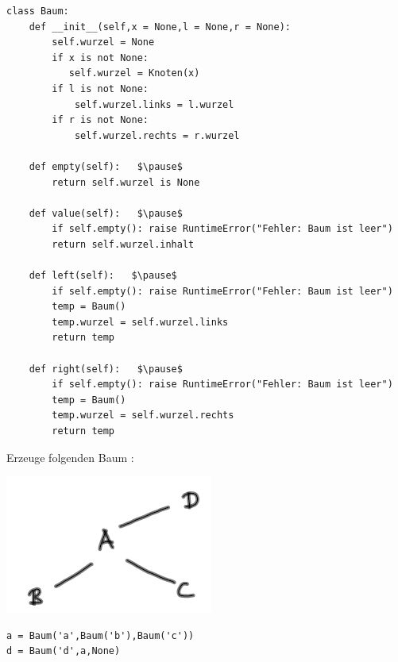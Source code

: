 \documentclass{beamer}
\begin{document}
\begin{frame}[fragile]
\begin{lstlisting}[basicstyle=\tiny]
class Baum:
    def __init__(self,x = None,l = None,r = None):
        self.wurzel = None
        if x is not None:
           self.wurzel = Knoten(x)
        if l is not None:
            self.wurzel.links = l.wurzel
        if r is not None:
            self.wurzel.rechts = r.wurzel
        
    def empty(self):   $\pause$
        return self.wurzel is None

    def value(self):   $\pause$
        if self.empty(): raise RuntimeError("Fehler: Baum ist leer")
        return self.wurzel.inhalt

    def left(self):   $\pause$
        if self.empty(): raise RuntimeError("Fehler: Baum ist leer")
        temp = Baum()
        temp.wurzel = self.wurzel.links
        return temp

    def right(self):   $\pause$
        if self.empty(): raise RuntimeError("Fehler: Baum ist leer")
        temp = Baum()
        temp.wurzel = self.wurzel.rechts
        return temp
\end{lstlisting} 
\end{frame}

\begin{frame}[fragile]

Erzeuge folgenden Baum :


 \includegraphics[scale=0.6]{bild8.png}  \pause

\begin{lstlisting}[mathescape=true]
a = Baum('a',Baum('b'),Baum('c'))
d = Baum('d',a,None)     
\end{lstlisting} 

\end{frame}
\end{document}
